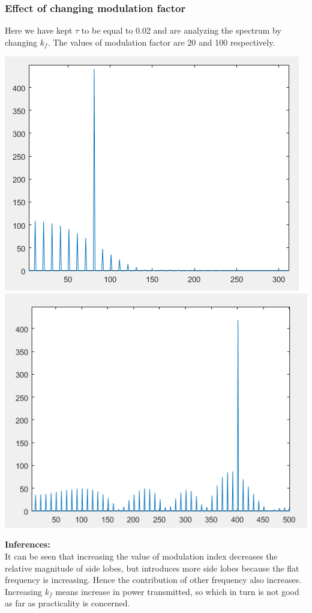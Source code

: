 \documentclass[12pt]{article}
\begin{document}
\subsubsection*{Effect of changing modulation factor}
Here we have kept $\tau$ to be equal to 0.02 and are analyzing the spectrum by changing $k_f$. The values of modulation factor are 20 and 100 respectively.
\begin{center}
     \includegraphics[scale = 0.75]{20.PNG}\\[1.0 cm]
     \includegraphics[scale = 0.75]{100.PNG}\\[1.0 cm]
\end{center}
\textbf{Inferences:} \\
It can be seen that increasing the value of modulation index decreases the relative magnitude of side lobes, but introduces more side lobes because the flat frequency is increasing. Hence the contribution of other frequency also increases. Increasing $k_f$ means increase in power transmitted, so which in turn is not good as far as practicality is concerned.
\end{document}
